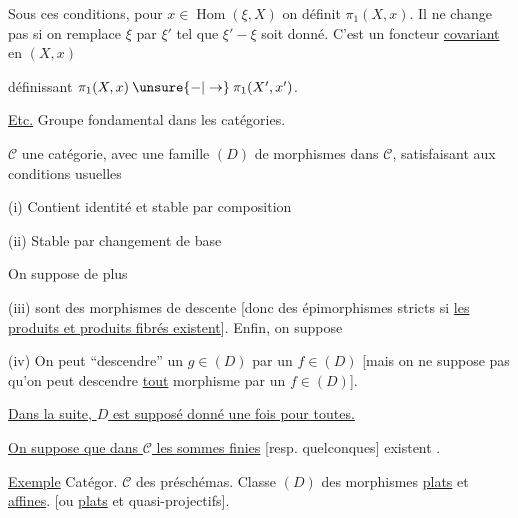 Sous ces conditions, pour $x\in\operatorname{Hom}(\xi,X)$ on définit $\pi_1(X,x)$.
Il ne change pas si on remplace $\xi$ par $\xi'$ tel que $\xi'-\xi$ soit donné.
C'est un foncteur \uline{covariant} en $(X,x)$

définissant $\pi_1(X,x)\mathbin{\unsure{-|\to}}\pi_1(X',x')$.

\uline{Etc.}
Groupe fondamental dans les catégories.

$\mathcal C$ une catégorie, avec une famille $(D)$ de morphismes dans $\mathcal C$, satisfaisant aux conditions usuelles

(i) Contient identité et stable par composition

(ii) Stable par changement de base

On suppose de plus

(iii)   sont des morphismes de descente [donc des épimorphismes stricts  si  \uline{les produits et produits fibrés existent}].
Enfin, on suppose



(iv) On peut ``descendre'' un $g\in(D)$ par un $f\in(D)$
[mais on ne suppose pas qu'on peut descendre \uline{tout} morphisme par un $f\in(D)$].

\uline{Dans la suite, $D$ est supposé donné une fois pour toutes.}

\uline{On suppose que dans $\mathcal C$ les sommes finies} [resp. quelconques] existent
.


\uline{Exemple}
Catégor. $\mathcal C$ des préschémas. 
Classe $(D)$ des morphismes \uline{plats} et \uline{affines}.
[ou \uline{plats} et quasi-projectifs].

